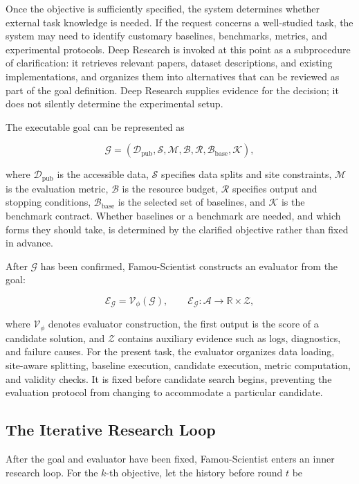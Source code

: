 Once the objective is sufficiently specified, the system determines whether external task knowledge is needed. If the request concerns a well-studied task, the system may need to identify customary baselines, benchmarks, metrics, and experimental protocols. Deep Research is invoked at this point as a subprocedure of clarification: it retrieves relevant papers, dataset descriptions, and existing implementations, and organizes them into alternatives that can be reviewed as part of the goal definition. Deep Research supplies evidence for the decision; it does not silently determine the experimental setup.

The executable goal can be represented as

\[
\mathcal{G}=(\mathcal{D}_{\mathrm{pub}},\mathcal{S},\mathcal{M},\mathcal{B},\mathcal{R},\mathcal{B}_{\mathrm{base}},\mathcal{K}),
\]

where $\mathcal{D}_{\mathrm{pub}}$ is the accessible data, $\mathcal{S}$ specifies data splits and site constraints, $\mathcal{M}$ is the evaluation metric, $\mathcal{B}$ is the resource budget, $\mathcal{R}$ specifies output and stopping conditions, $\mathcal{B}_{\mathrm{base}}$ is the selected set of baselines, and $\mathcal{K}$ is the benchmark contract. Whether baselines or a benchmark are needed, and which forms they should take, is determined by the clarified objective rather than fixed in advance.

After $\mathcal{G}$ has been confirmed, Famou-Scientist constructs an evaluator from the goal:

\[
\mathcal{E}_{\mathcal{G}}=\mathcal{V}_{\phi}(\mathcal{G}),
\qquad
\mathcal{E}_{\mathcal{G}}:\mathcal{A}\rightarrow\mathbb{R}\times\mathcal{Z},
\]

where $\mathcal{V}_{\phi}$ denotes evaluator construction, the first output is the score of a candidate solution, and $\mathcal{Z}$ contains auxiliary evidence such as logs, diagnostics, and failure causes. For the present task, the evaluator organizes data loading, site-aware splitting, baseline execution, candidate execution, metric computation, and validity checks. It is fixed before candidate search begins, preventing the evaluation protocol from changing to accommodate a particular candidate.

\subsection{The Iterative Research Loop}
\label{sec:agent_loop}

After the goal and evaluator have been fixed, Famou-Scientist enters an inner research loop. For the $k$-th objective, let the history before round $t$ be

